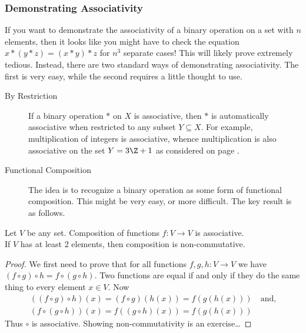 \subsubsection*{Demonstrating Associativity}

If you want to demonstrate the associativity of a binary operation on a set with $n$ elements, then it looks like you might have to check the equation $x*(y*z)=(x*y)*z$ for $n^3$ separate cases! This will likely prove extremely tedious. Instead, there are two standard ways of demonstrating associativity. The first is very easy, while the second requires a little thought to use.

\begin{description}
\item[By Restriction] If a binary operation $*$ on $X$ is associative, then $*$ is automatically associative when restricted to any subset $Y\subseteq X$. For example, multiplication of integers is associative, whence multiplication is also associative on the set $Y=3\Z+1$ as considered on page \pageref{intro:modex}.
\item[Functional Composition] The idea is to recognize a binary operation as some form of functional composition. This might be very easy, or more difficult. The key result is as follows.
\end{description}

\begin{thm}\label{thm:funcassoc}
Let $V$ be any set. Composition of functions $f:V\to V$ is associative.\\
If $V$ has at least 2 elements, then composition is non-commutative.
\end{thm}

\begin{proof}
We first need to prove that for all functions $f,g,h:V\to V$ we have $(f\circ g)\circ h=f\circ(g\circ h)$. Two functions are equal if and only if they do the same thing to every element $x\in V$. Now
\begin{gather*}
((f\circ g)\circ h)(x)=(f\circ g)(h(x))=f(g(h(x)))\quad\text{and,}\\
(f\circ(g\circ h))(x)=f((g\circ h)(x))=f(g(h(x)))
\end{gather*}
Thus $\circ$ is associative. Showing non-commutativity is an exercise\ldots
\end{proof}

